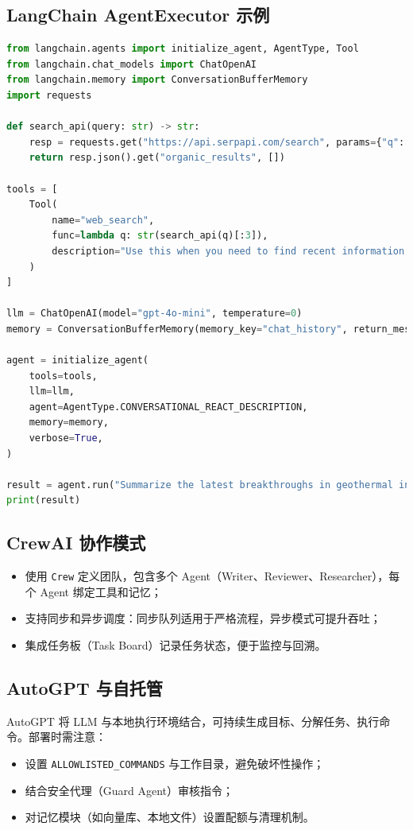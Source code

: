 \documentclass[UTF8,zihao=-4]{ctexart}
\begin{document}
\subsection{LangChain AgentExecutor 示例}
\begin{lstlisting}[language=Python,caption={LangChain 基于 Planner-Executor 模式的 Agent}]
from langchain.agents import initialize_agent, AgentType, Tool
from langchain.chat_models import ChatOpenAI
from langchain.memory import ConversationBufferMemory
import requests

def search_api(query: str) -> str:
    resp = requests.get("https://api.serpapi.com/search", params={"q": query, "api_key": "KEY"})
    return resp.json().get("organic_results", [])

tools = [
    Tool(
        name="web_search",
        func=lambda q: str(search_api(q)[:3]),
        description="Use this when you need to find recent information on the web."
    )
]

llm = ChatOpenAI(model="gpt-4o-mini", temperature=0)
memory = ConversationBufferMemory(memory_key="chat_history", return_messages=True)

agent = initialize_agent(
    tools=tools,
    llm=llm,
    agent=AgentType.CONVERSATIONAL_REACT_DESCRIPTION,
    memory=memory,
    verbose=True,
)

result = agent.run("Summarize the latest breakthroughs in geothermal inversion.")
print(result)
\end{lstlisting}

\subsection{CrewAI 协作模式}
\begin{itemize}
  \item 使用 \texttt{Crew} 定义团队，包含多个 Agent（Writer、Reviewer、Researcher），每个 Agent 绑定工具和记忆；
  \item 支持同步和异步调度：同步队列适用于严格流程，异步模式可提升吞吐；
  \item 集成任务板（Task Board）记录任务状态，便于监控与回溯。
\end{itemize}

\subsection{AutoGPT 与自托管}
AutoGPT 将 LLM 与本地执行环境结合，可持续生成目标、分解任务、执行命令。部署时需注意：
\begin{itemize}
  \item 设置 \texttt{ALLOWLISTED\_COMMANDS} 与工作目录，避免破坏性操作；
  \item 结合安全代理（Guard Agent）审核指令；
  \item 对记忆模块（如向量库、本地文件）设置配额与清理机制。
\end{itemize}
\end{document}
